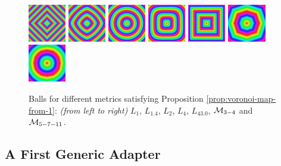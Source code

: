 \documentclass{llncs}
\begin{document}
\begin{figure}
 {\includegraphics[width=1.65cm]{image-ball-1}}
 {\includegraphics[width=1.65cm]{image-ball-1_3999999999999999.png}}
 {\includegraphics[width=1.65cm]{image-ball-2}}
 {\includegraphics[width=1.65cm]{image-ball-4}}
 {\includegraphics[width=1.65cm]{image-ball-43_100000000000001.png}}
 {\includegraphics[width=1.65cm]{image-ball-chamf34}}
 {\includegraphics[width=1.65cm]{image-ball-chamf5711}}
  \caption{Balls for different metrics satisfying Proposition \ref{prop:voronoi-map-from-1}: \emph{(from
      left to right)} $L_1$, $L_{1.4}$, $L_2$, $L_4$, $L_{43.0}$,
    $\mathcal{M}_{3-4}$ and $\mathcal{M}_{5-7-11}$.}
  \label{fig:metrics}
\end{figure}



\subsection{A First Generic Adapter}
\label{sec:first-gener-adapt}
\end{document}
